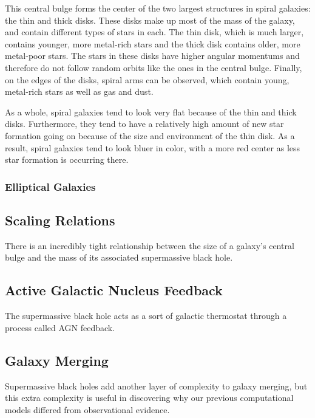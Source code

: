 \documentclass[12pt]{article}
\begin{document}
    This central bulge forms the center of the two largest structures in spiral
    galaxies: the thin and thick disks.  These disks make up most of the mass of
    the galaxy, and contain different types of stars in each.  The thin disk,
    which is much larger, contains younger, more metal-rich stars and the thick
    disk contains older, more metal-poor stars.  The stars in these disks have
    higher angular momentums and therefore do not follow random orbits like the
    ones in the central bulge.  Finally, on the edges of the disks, spiral arms
    can be observed, which contain young, metal-rich stars as well as gas and
    dust.

    As a whole, spiral galaxies tend to look very flat because of the thin and
    thick disks.  Furthermore, they tend to have a relatively high amount of new
    star formation going on because of the size and environment of the thin
    disk.  As a result, spiral galaxies tend to look bluer in color, with a more
    red center as less star formation is occurring there.

    \subsubsection*{Elliptical Galaxies}




\subsection*{\bf Scaling Relations}
There is an incredibly tight relationship between the size of a galaxy's central
bulge and the mass of its associated supermassive black hole.

\subsection*{\bf Active Galactic Nucleus Feedback}
The supermassive black hole acts as a sort of galactic thermostat through a
process called AGN feedback.

\subsection *{\bf Galaxy Merging}
Supermassive black holes add another layer of complexity to galaxy merging, but
this extra complexity is useful in discovering why our previous computational
models differed from observational evidence.
\end{document}
